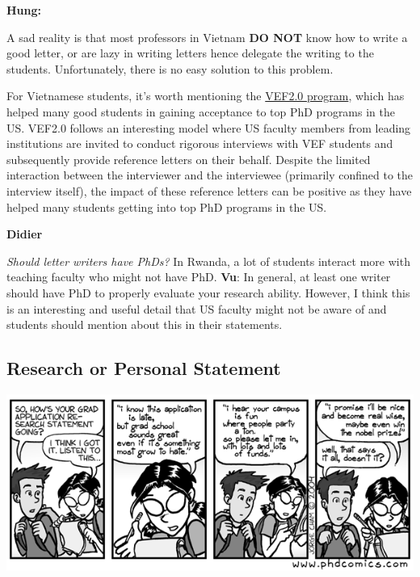 \documentclass[11pt]{article}
\newenvironment{commentbox}[1][]{
\small
    \begin{cbox}
    \textbf{#1} 
 }{
   \end{cbox}
}
\begin{document}
\begin{commentbox}[Hung:]
A sad reality is that most professors in Vietnam \textbf{DO NOT} know how to write a good letter, or are lazy in writing letters hence delegate the writing to the students. Unfortunately, there is no easy solution to this problem.
\end{commentbox}

For Vietnamese students, it's worth mentioning the \href{https://vef2.org/}{VEF2.0 program}, which has helped many good students in gaining acceptance to top PhD programs in the US. VEF2.0 follows an interesting model where US faculty members from leading institutions are invited to conduct rigorous interviews with VEF students and subsequently provide reference letters on their behalf. Despite the limited interaction between the interviewer and the interviewee (primarily confined to the interview itself), the impact of these reference letters can be positive as they have helped many students getting into top PhD programs in the US.

\begin{commentbox}[Didier]
\emph{Should letter writers have PhDs?}  In Rwanda, a lot of students interact more with teaching faculty who might not have PhD.
\tcblower
\textbf{Vu}: In general, at least one writer should have PhD to properly evaluate your research ability.  However, I think this is an interesting and useful detail that US faculty might not be aware of and students should mention about this in their statements.
\end{commentbox}

\subsection{Research or Personal Statement}\label{sec:research-statement}


    \begin{center}
      \includegraphics[scale=0.5]{c2.png}
    \end{center}
\end{document}
